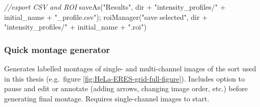 \documentclass[
  12pt,
  a4paper,
]{book}
\newenvironment{Shaded}{}{}
\newcommand{\CommentTok}[1]{\textcolor[rgb]{0.38,0.63,0.69}{\textit{#1}}}
\newcommand{\NormalTok}[1]{#1}
\newcommand{\OperatorTok}[1]{\textcolor[rgb]{0.40,0.40,0.40}{#1}}
\newcommand{\StringTok}[1]{\textcolor[rgb]{0.25,0.44,0.63}{#1}}
\begin{document}
\begin{Shaded}
\begin{Highlighting}[]
\CommentTok{//export CSV and ROI}
\NormalTok{saveAs}\OperatorTok{(}\StringTok{"Results"}\OperatorTok{,}\NormalTok{ dir }\OperatorTok{+} \StringTok{"intensity\_profiles/"} \OperatorTok{+}\NormalTok{ initial\_name }\OperatorTok{+} \StringTok{"\_profile.csv"}\OperatorTok{);}
\NormalTok{roiManager}\OperatorTok{(}\StringTok{"save selected"}\OperatorTok{,}\NormalTok{ dir }\OperatorTok{+} \StringTok{"intensity\_profiles/"} \OperatorTok{+}\NormalTok{ initial\_name }\OperatorTok{+} \StringTok{".roi"}\OperatorTok{)}
\end{Highlighting}
\end{Shaded}

\hypertarget{quick-montage-generator}{%
\subsubsection{Quick montage generator}\label{quick-montage-generator}}

Generates labelled montages of single- and multi-channel images of the sort used in this thesis (e.g.~figure \ref{fig:HeLa-ERES-grid-full-figure}). Includes option to pause and edit or annotate (adding arrows, changing image order, etc.) before generating final montage. Requires single-channel images to start.
\end{document}
